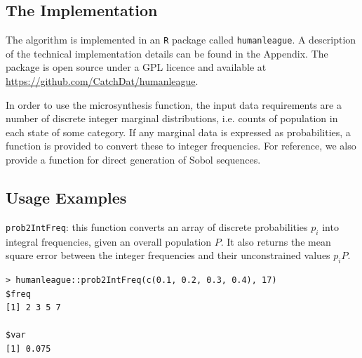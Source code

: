 \documentclass{JASSS}
\newenvironment{Shaded}{\begin{snugshade}}{\end{snugshade}}
\begin{document}
\subsection{The Implementation}\label{the-implementation}

The algorithm is implemented in an \texttt{R} package called
\texttt{humanleague}. A description of the technical implementation details can be found in the Appendix. The package is open source under a GPL licence and available at \url{https://github.com/CatchDat/humanleague}.

In order to use the microsynthesis function, the input data requirements are a number of discrete integer marginal distributions, i.e. counts of population in each state of some category. If any marginal data is expressed as probabilities, a function is provided to convert these to integer frequencies. For reference, we also provide a function for direct generation of Sobol sequences.

\subsection{Usage Examples}\label{usage-examples}

\texttt{prob2IntFreq}: this function converts an array of discrete probabilities \(p_i\) into integral frequencies, given an overall population \(P\). It also returns the mean square error between the integer frequencies and their unconstrained values \(p_iP\).

\begin{Shaded}
\begin{verbatim}
> humanleague::prob2IntFreq(c(0.1, 0.2, 0.3, 0.4), 17)
$freq
[1] 2 3 5 7

$var
[1] 0.075
\end{verbatim}
\end{Shaded}
\end{document}
